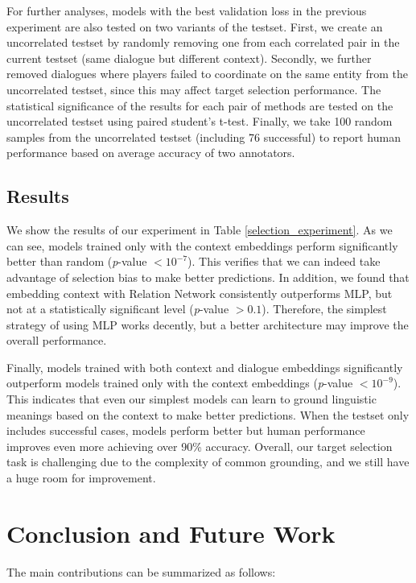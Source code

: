 \documentclass[letterpaper]{article}
\begin{document}
For further analyses, models with the best validation loss in the previous experiment are also tested on two variants of the testset. First, we create an uncorrelated testset by randomly removing one from each correlated pair in the current testset (same dialogue but different context). Secondly, we further removed dialogues where players failed to coordinate on the same entity from the uncorrelated testset, since this may affect target selection performance. The statistical significance of the results for each pair of methods are tested on the uncorrelated testset using paired student's t-test. Finally, we take 100 random samples from the uncorrelated testset (including 76 successful) to report human performance based on average accuracy of two annotators.

\subsection{Results}

We show the results of our experiment in Table \ref{selection_experiment}. As we can see, models trained only with the context embeddings perform significantly better than random (\textit{p}-value $<10^{-7}$). This verifies that we can indeed take advantage of selection bias to make better predictions.  In addition, we found that embedding context with Relation Network consistently outperforms MLP, but not at a statistically significant level (\textit{p}-value $>0.1$). Therefore, the simplest strategy of using MLP works decently, but a better architecture may improve the overall performance.

Finally, models trained with both context and dialogue embeddings significantly outperform models trained only with the context embeddings (\textit{p}-value $<10^{-9}$). This indicates that even our simplest models can learn to ground linguistic meanings based on the context to make better predictions. When the testset only includes successful cases, models perform better but human performance improves even more achieving over 90\% accuracy. Overall, our target selection task is challenging due to the complexity of common grounding, and we still have a huge room for improvement.

\section{Conclusion and Future Work}
\label{section:conclusion}

The main contributions can be summarized as follows:
\end{document}
